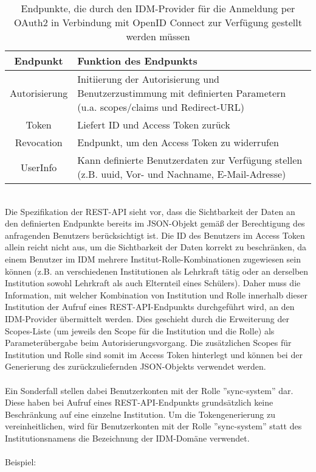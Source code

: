 \begin{table}[htb]
    \begin{tabularx}{\textwidth}{|c|X|}
        \hline
\textbf{Endpunkt} & \textbf{Funktion des Endpunkts} \\ \hline
Autorisierung & Initiierung der Autorisierung und Benutzerzustimmung mit definierten Parametern (u.a. scopes/claims und Redirect-URL) \\ \hline
Token & Liefert ID und Access Token zurück \\ \hline
Revocation & Endpunkt, um den Access Token zu widerrufen \\ \hline
UserInfo & Kann definierte Benutzerdaten zur Verfügung stellen (z.B. uuid, Vor- und Nachname, E-Mail-Adresse) \\ \hline
    \end{tabularx}

        \caption{Endpunkte, die durch den IDM-Provider für die Anmeldung per OAuth2 in Verbindung mit OpenID Connect zur Verfügung gestellt werden müssen}
        \label{tab:auth:endpoints}
\end{table}
\\
Die Spezifikation der REST-API sieht vor, dass die Sichtbarkeit der Daten an den definierten Endpunkte bereits im JSON-Objekt gemäß der Berechtigung des anfragenden Benutzers berücksichtigt ist. 
Die ID des Benutzers im Access Token allein reicht nicht aus, um die Sichtbarkeit der Daten korrekt zu beschränken, da einem Benutzer im IDM mehrere Institut-Rolle-Kombinationen zugewiesen sein können (z.B. an verschiedenen Institutionen als Lehrkraft tätig oder an derselben Institution sowohl Lehrkraft als auch Elternteil eines Schülers). 
Daher muss die Information, mit welcher Kombination von Institution und Rolle innerhalb dieser Institution der Aufruf eines REST-API-Endpunkts durchgeführt wird, an den IDM-Provider übermittelt werden. 
Dies geschieht durch die Erweiterung der Scopes-Liste (um jeweils den Scope für die Institution und die Rolle) als Parameterübergabe beim Autorisierungsvorgang. 
Die zusätzlichen Scopes für Institution und Rolle sind somit im Access Token hinterlegt und können bei der Generierung des zurückzuliefernden JSON-Objekts verwendet werden. \\
\\
Ein Sonderfall stellen dabei Benutzerkonten mit der Rolle ''sync-system'' dar. 
Diese haben bei Aufruf eines REST-API-Endpunkts grundsätzlich keine Beschränkung auf eine einzelne Institution. 
Um die Tokengenerierung zu vereinheitlichen, wird für Benutzerkonten mit der Rolle ''sync-system'' statt des Institutionsnamens die Bezeichnung der IDM-Domäne verwendet.\\
\\
Beispiel:\\

